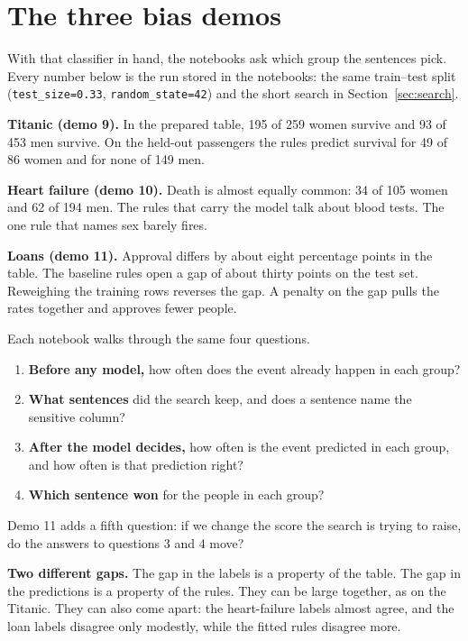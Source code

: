 \documentclass[11pt]{article}
\newcommand{\fn}[1]{\texttt{\small #1}}
\begin{document}
\section{The three bias demos}
\label{sec:picture}

With that classifier in hand, the notebooks ask which group the sentences pick. Every number below is the run stored in the notebooks: the same train--test split (\fn{test\_size=0.33}, \fn{random\_state=42}) and the short search in Section~\ref{sec:search}.

\begin{lesson}
\textbf{Titanic (demo 9).} In the prepared table, 195 of 259 women survive and 93 of 453 men survive. On the held-out passengers the rules predict survival for 49 of 86 women and for none of 149 men.

\textbf{Heart failure (demo 10).} Death is almost equally common: 34 of 105 women and 62 of 194 men. The rules that carry the model talk about blood tests. The one rule that names sex barely fires.

\textbf{Loans (demo 11).} Approval differs by about eight percentage points in the table. The baseline rules open a gap of about thirty points on the test set. Reweighing the training rows reverses the gap. A penalty on the gap pulls the rates together and approves fewer people.
\end{lesson}

Each notebook walks through the same four questions.

\begin{enumerate}
  \item \textbf{Before any model,} how often does the event already happen in each group?
  \item \textbf{What sentences} did the search keep, and does a sentence name the sensitive column?
  \item \textbf{After the model decides,} how often is the event predicted in each group, and how often is that prediction right?
  \item \textbf{Which sentence won} for the people in each group?
\end{enumerate}

Demo 11 adds a fifth question: if we change the score the search is trying to raise, do the answers to questions 3 and 4 move?

\begin{idea}
\textbf{Two different gaps.} The gap in the labels is a property of the table. The gap in the predictions is a property of the rules. They can be large together, as on the Titanic. They can also come apart: the heart-failure labels almost agree, and the loan labels disagree only modestly, while the fitted rules disagree more.
\end{idea}
\end{document}
